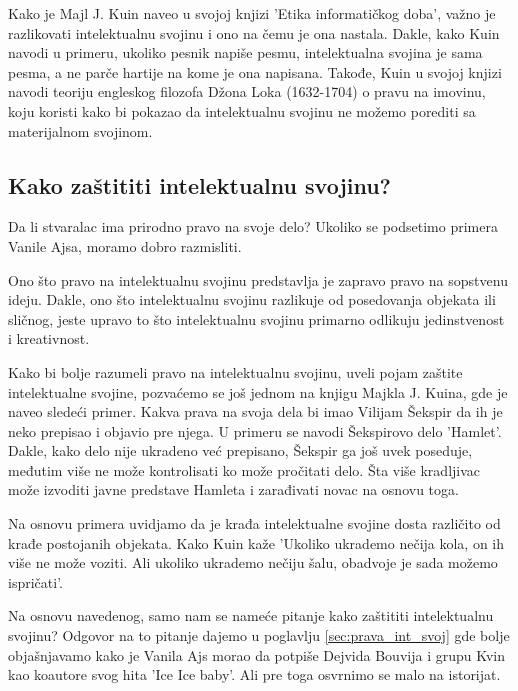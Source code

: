 \documentclass[a4paper]{article}
\begin{document}
Kako je Majl J. Kuin naveo u svojoj knjizi 'Etika informatičkog doba', \cite{ethics} važno je razlikovati 
intelektualnu svojinu i ono na čemu je ona nastala. Dakle, kako Kuin navodi u primeru, ukoliko pesnik
napiše pesmu, intelektualna svojina je sama pesma, a ne parče hartije na kome je ona napisana.
Takođe, Kuin u svojoj knjizi navodi teoriju engleskog filozofa Džona Loka (1632-1704) o pravu na imovinu,
koju koristi kako bi pokazao da intelektualnu svojinu ne možemo porediti sa materijalnom svojinom.

\subsection{Kako zaštititi intelektualnu svojinu?}
Da li stvaralac ima prirodno pravo na svoje delo? Ukoliko se podsetimo primera Vanile Ajsa, moramo
dobro razmisliti.

Ono što pravo na intelektualnu svojinu predstavlja je zapravo pravo na sopstvenu ideju. Dakle, ono što 
intelektualnu svojinu razlikuje od posedovanja objekata ili sličnog, jeste upravo to što intelektualnu
svojinu primarno odlikuju jedinstvenost i kreativnost.

Kako bi bolje razumeli pravo na intelektualnu svojinu, uveli pojam zaštite intelektualne svojine,
pozvaćemo se još jednom na knjigu Majkla J. Kuina, \cite{ethics} gde je naveo sledeći primer.
Kakva prava na svoja dela bi imao Vilijam Šekspir da ih je neko prepisao i objavio pre njega. U primeru se navodi
Šekspirovo delo 'Hamlet'. Dakle, kako delo nije ukradeno već prepisano, Šekspir ga još uvek poseduje, međutim
više ne može kontrolisati ko može pročitati delo. Šta više  kradljivac može izvoditi javne predstave
Hamleta i zarađivati novac na osnovu toga.

Na osnovu primera uvidjamo da je krađa intelektualne svojine dosta različito od krađe postojanih objekata.
Kako Kuin kaže 'Ukoliko ukrademo nečija kola, on ih više ne može voziti. Ali ukoliko ukrademo nečiju šalu, 
obadvoje je sada možemo ispričati'.

Na osnovu navedenog, samo nam se nameće pitanje kako zaštititi intelektualnu svojinu? Odgovor na to pitanje
dajemo u poglavlju \ref{sec:prava_int_svoj} gde bolje objašnjavamo kako je Vanila Ajs morao da potpiše Dejvida Bouvija i grupu
Kvin kao koautore svog hita 'Ice Ice baby'. Ali pre toga osvrnimo se malo na istorijat.

\end{document}
